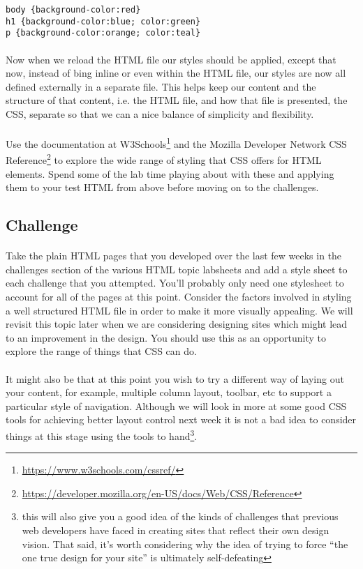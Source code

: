 \documentclass[10pt, a4paper, twosize]{article}
\begin{document}
\begin{lstlisting}
body {background-color:red}
h1 {background-color:blue; color:green}
p {background-color:orange; color:teal}
\end{lstlisting}

\paragraph{} Now when we reload the HTML file our styles should be applied, except that now, instead of bing inline or even within the HTML file, our styles are now all defined externally in a separate file. This helps keep our content and the structure of that content, i.e. the HTML file, and how that file is presented, the CSS, separate so that we can a nice balance of simplicity and flexibility.

\paragraph{} Use the documentation at W3Schools\footnote{\url{https://www.w3schools.com/cssref/}} and the Mozilla Developer Network CSS Reference\footnote{\url{https://developer.mozilla.org/en-US/docs/Web/CSS/Reference}} to explore the wide range of styling that CSS offers for HTML elements. Spend some of the lab time playing about with these and applying them to your test HTML from above before moving on to the challenges.

\subsection{Challenge}
\paragraph{} Take the plain HTML pages that you developed over the last few weeks in the challenges section of the various HTML topic labsheets and add a style sheet to each challenge that you attempted. You'll probably only need one stylesheet to account for all of the pages at this point. Consider the factors involved in styling a well structured HTML file in order to make it more visually appealing. We will revisit this topic later when we are considering designing sites which might lead to an improvement in the design. You should use this as an opportunity to explore the range of things that CSS can do.

\paragraph{} It might also be that at this point you wish to try a different way of laying out your content, for example, multiple column layout, toolbar, etc to support a particular style of navigation. Although we will look in more at some good CSS tools for achieving better layout control next week it is not a bad idea to consider things at this stage using the tools to hand\footnote{this will also give you a good idea of the kinds of challenges that previous web developers have faced in creating sites that reflect their own design vision. That said, it's worth considering why the idea of trying to force ``the one true design for your site'' is ultimately self-defeating}.
\end{document}
